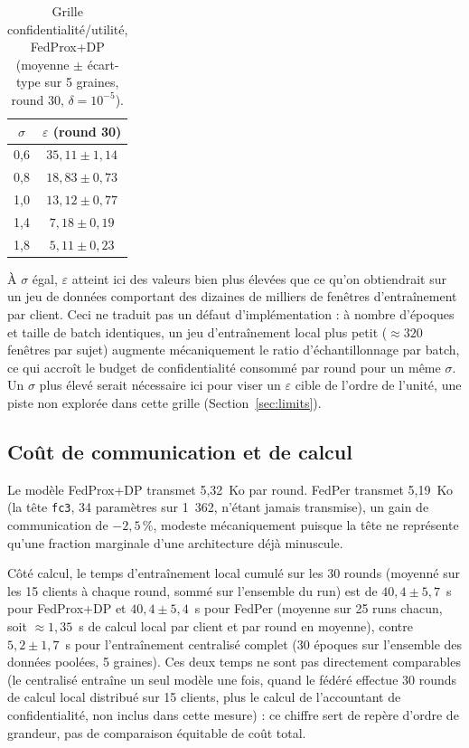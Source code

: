 \documentclass{acmart}
\begin{document}
\begin{table}[h!]
  \centering
  \small
  \caption{Grille confidentialité/utilité, FedProx+DP (moyenne $\pm$
  écart-type sur 5 graines, round 30, $\delta=10^{-5}$).}
  \label{tab:eps_wesad}
  \begin{tabular}{cc}
    \toprule
    $\sigma$ & $\varepsilon$ (round 30) \\
    \midrule
    0,6 & $35{,}11 \pm 1{,}14$ \\
    0,8 & $18{,}83 \pm 0{,}73$ \\
    1,0 & $13{,}12 \pm 0{,}77$ \\
    1,4 & $7{,}18 \pm 0{,}19$ \\
    1,8 & $5{,}11 \pm 0{,}23$ \\
    \bottomrule
  \end{tabular}
\end{table}

À $\sigma$ égal, $\varepsilon$ atteint ici des valeurs bien plus élevées que
ce qu'on obtiendrait sur un jeu de données comportant des dizaines de
milliers de fenêtres d'entraînement par client. Ceci ne traduit pas un
défaut d'implémentation : à nombre d'époques et taille de batch identiques,
un jeu d'entraînement local plus petit ($\approx 320$ fenêtres par sujet)
augmente mécaniquement le ratio d'échantillonnage par batch, ce qui accroît
le budget de confidentialité consommé par round pour un même $\sigma$. Un
$\sigma$ plus élevé serait nécessaire ici pour viser un $\varepsilon$
cible de l'ordre de l'unité, une piste non explorée dans cette grille
(Section~\ref{sec:limits}).

\subsection{Coût de communication et de calcul}

Le modèle FedProx+DP transmet 5,32~Ko par round. FedPer transmet 5,19~Ko (la
tête \texttt{fc3}, 34 paramètres sur 1~362, n'étant jamais transmise), un
gain de communication de $-2{,}5\,\%$, modeste mécaniquement puisque la
tête ne représente qu'une fraction marginale d'une architecture déjà
minuscule.

Côté calcul, le temps d'entraînement local cumulé sur les 30 rounds (moyenné
sur les 15 clients à chaque round, sommé sur l'ensemble du run) est de
$40{,}4 \pm 5{,}7$~s pour FedProx+DP et $40{,}4 \pm 5{,}4$~s pour FedPer
(moyenne sur 25 runs chacun, soit $\approx 1{,}35$~s de calcul local par
client et par round en moyenne), contre $5{,}2 \pm 1{,}7$~s pour
l'entraînement centralisé complet (30 époques sur l'ensemble des données
poolées, 5 graines). Ces deux temps ne sont pas directement comparables
(le centralisé entraîne un seul modèle une fois, quand le fédéré effectue
30 rounds de calcul local distribué sur 15 clients, plus le calcul de
l'accountant de confidentialité, non inclus dans cette mesure) : ce chiffre
sert de repère d'ordre de grandeur, pas de comparaison équitable de coût
total.
\end{document}
